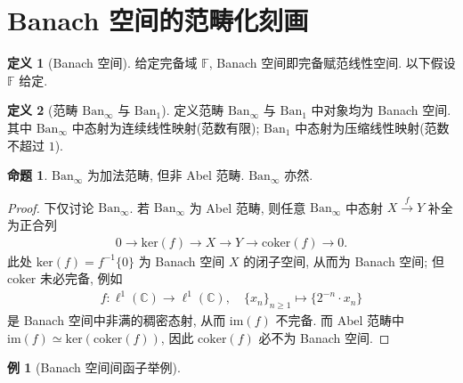 \documentclass{MainStyle}
\theoremstyle{definition}
\newtheorem{example}{例}
\theoremstyle{definition}
\theoremstyle{definition}
\newtheorem{definition}{定义}
\theoremstyle{definition}
\newtheorem{proposition}{命题}
\theoremstyle{definition}
\theoremstyle{definition}
\theoremstyle{definition}
\theoremstyle{remark}
\theoremstyle{remark}
\begin{document}
\maketitle
\section{Banach 空间的范畴化刻画}

\begin{definition}[Banach 空间]
    给定完备域 $\mathbb F$, Banach 空间即完备赋范线性空间. 以下假设 $\mathbb F$ 给定.
\end{definition}

\begin{definition}[范畴 $\mathrm{Ban}_\infty$ 与 $\mathrm{Ban}_1$]
    定义范畴 $\mathrm{Ban}_\infty$ 与 $\mathrm{Ban}_1$ 中对象均为 Banach 空间. 其中 $\mathrm{Ban}_\infty$ 中态射为连续线性映射(范数有限); $\mathrm{Ban}_1$ 中态射为压缩线性映射(范数不超过 $1$).
\end{definition}

\begin{proposition}
    $\mathrm{Ban}_\infty$ 为加法范畴, 但非 Abel 范畴. $\mathrm{Ban}_\infty$ 亦然.
    \begin{proof}
        下仅讨论 $\mathrm{Ban}_\infty$. 若 $\mathrm{Ban}_\infty$ 为 Abel 范畴, 则任意 $\mathrm{Ban}_\infty$ 中态射 $X\overset f\to Y$ 补全为正合列
        \begin{align*}
            0\to \mathrm{ker}(f)\to X\to Y\to \mathrm{coker}(f)\to 0.
        \end{align*}
        此处 $\mathrm{ker}(f)=f^{-1}\{0\}$ 为 Banach 空间 $X$ 的闭子空间, 从而为 Banach 空间; 但 $\mathrm{coker}$ 未必完备, 例如
        \begin{align*}
            f:\ell^1(\mathbb C)\to \ell^1(\mathbb C),\quad \{x_n\}_{n\geq 1}\mapsto \{2^{-n}\cdot x_n\}
        \end{align*}
        是 Banach 空间中非满的稠密态射, 从而 $\mathrm{im}(f)$ 不完备. 而 Abel 范畴中 $\mathrm{im}(f)\simeq \mathrm{ker}(\mathrm{coker}(f))$, 因此 $\mathrm{coker}(f)$ 必不为 Banach 空间.
    \end{proof}
\end{proposition}

\begin{example}[Banach 空间间函子举例]

\end{example}
\end{document}
